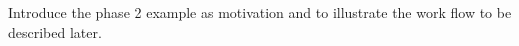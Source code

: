 
Introduce the phase 2 example as motivation and to illustrate the work flow to be described later. 
